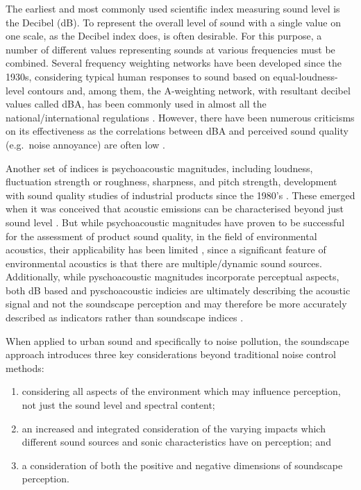 \documentclass[
  authoryear,
  preprint,
  3p]{elsarticle}
\providecommand{\tightlist}{%
  \setlength{\itemsep}{0pt}\setlength{\parskip}{0pt}}\usepackage{longtable,booktabs,array}
\begin{document}
The earliest and most commonly used scientific index measuring sound
level is the Decibel (dB). To represent the overall level of sound with
a single value on one scale, as the Decibel index does, is often
desirable. For this purpose, a number of different values representing
sounds at various frequencies must be combined. Several frequency
weighting networks have been developed since the 1930s, considering
typical human responses to sound based on equal-loudness-level contours
\citep{Fletcher1933Loudness} and, among them, the A-weighting network,
with resultant decibel values called dBA, has been commonly used in
almost all the national/international regulations
\citep{Kryter1970Effects}. However, there have been numerous criticisms
on its effectiveness \citep{Parmanen2007weighted} as the correlations
between dBA and perceived sound quality (e.g.~noise annoyance) are often
low \citep{Hellman1987Why}.

Another set of indices is psychoacoustic magnitudes, including loudness,
fluctuation strength or roughness, sharpness, and pitch strength,
development with sound quality studies of industrial products since the
1980's \citep{Zwicker2007Psychoacoustics}. These emerged when it was
conceived that acoustic emissions can be characterised beyond just sound
level \citep{Blauert1997Sound}. But while psychoacoustic magnitudes have
proven to be successful for the assessment of product sound quality, in
the field of environmental acoustics, their applicability has been
limited \citep{Fastl2006Psychoacoustic}, since a significant feature of
environmental acoustics is that there are multiple/dynamic sound
sources. Additionally, while pyschoacoustic magnitudes incorporate
perceptual aspects, both dB based and pyschoacoustic indicies are
ultimately describing the acoustic signal and not the soundscape
perception and may therefore be more accurately described as indicators
rather than soundscape indices \citep{Mitchell2023conceptual}.

When applied to urban sound and specifically to noise pollution, the
soundscape approach introduces three key considerations beyond
traditional noise control methods:

\begin{enumerate}
\def\labelenumi{\arabic{enumi}.}
\tightlist
\item
  considering all aspects of the environment which may influence
  perception, not just the sound level and spectral content;
\item
  an increased and integrated consideration of the varying impacts which
  different sound sources and sonic characteristics have on perception;
  and
\item
  a consideration of both the positive and negative dimensions of
  soundscape perception.
\end{enumerate}
\end{document}
